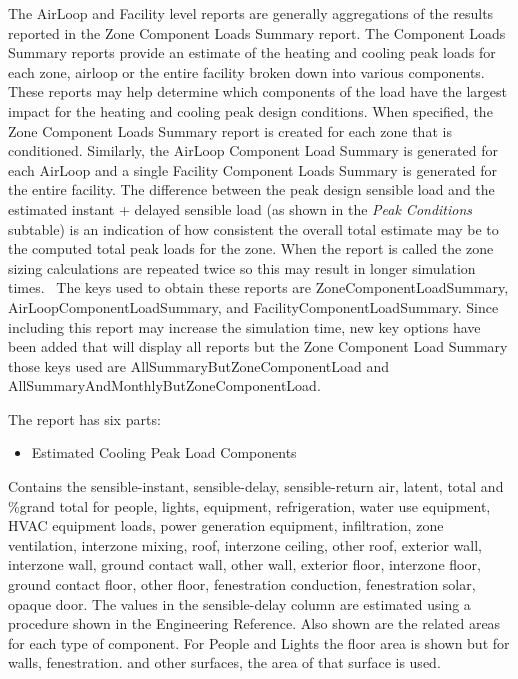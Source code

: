 The AirLoop and Facility level reports are generally aggregations of the results reported in the Zone Component Loads Summary report. The Component Loads Summary reports provide an estimate of the heating and cooling peak loads for each zone, airloop or the entire facility broken down into various components. These reports may help determine which components of the load have the largest impact for the heating and cooling peak design conditions. When specified, the Zone Component Loads Summary report is created for each zone that is conditioned. Similarly, the AirLoop Component Load Summary is generated for each AirLoop and a single Facility Component Loads Summary is generated for the entire facility. The difference between the peak design sensible load and the estimated instant + delayed sensible load (as shown in the \emph{Peak Conditions} subtable) is an indication of how consistent the overall total estimate may be to the computed total peak loads for the zone. When the report is called the zone sizing calculations are repeated twice so this may result in longer simulation times.~ The keys used to obtain these reports are ZoneComponentLoadSummary, AirLoopComponentLoadSummary, and FacilityComponentLoadSummary. Since including this report may increase the simulation time, new key options have been added that will display all reports but the Zone Component Load Summary those keys used are AllSummaryButZoneComponentLoad and AllSummaryAndMonthlyButZoneComponentLoad.

The report has six parts:

\begin{itemize}
\tightlist
\item
  Estimated Cooling Peak Load Components
\end{itemize}

Contains the sensible-instant, sensible-delay, sensible-return air, latent, total and \%grand total for people, lights, equipment, refrigeration, water use equipment, HVAC equipment loads, power generation equipment, infiltration, zone ventilation, interzone mixing, roof, interzone ceiling, other roof, exterior wall, interzone wall, ground contact wall, other wall, exterior floor, interzone floor, ground contact floor, other floor, fenestration conduction, fenestration solar, opaque door. The values in the sensible-delay column are estimated using a procedure shown in the Engineering Reference. Also shown are the related areas for each type of component. For People and Lights the floor area is shown but for walls, fenestration. and other surfaces, the area of that surface is used.

